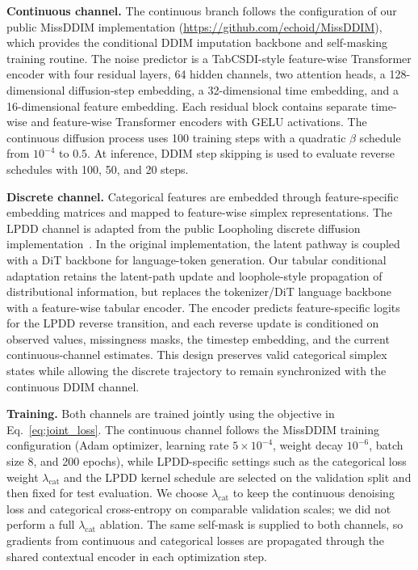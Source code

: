 \documentclass[times, review, 10pt]{elsarticle}
\newcommand{\DIFaddbegin}{\begingroup\color{blue}}
\newcommand{\DIFaddend}{\endgroup}
\begin{document}
\DIFaddend
\textbf{Continuous channel.}
\DIFaddbegin
The continuous branch follows the configuration of our public MissDDIM
implementation (\url{https://github.com/echoid/MissDDIM}), which provides the
conditional DDIM imputation backbone and self-masking training routine. The
noise predictor is a TabCSDI-style feature-wise Transformer encoder with four
residual layers, 64 hidden channels, two attention heads, a 128-dimensional
diffusion-step embedding, a 32-dimensional time embedding, and a
16-dimensional feature embedding. Each residual block contains separate
time-wise and feature-wise Transformer encoders with GELU activations. The
continuous diffusion process uses 100 training steps with a quadratic
$\beta$ schedule from $10^{-4}$ to $0.5$. At inference, DDIM step skipping is
used to evaluate reverse schedules with 100, 50, and 20 steps.
\DIFaddend

\textbf{Discrete channel.}
Categorical features are embedded through feature-specific embedding
\DIFaddbegin
matrices and mapped to feature-wise simplex representations. The LPDD channel
is adapted from the public Loopholing discrete diffusion implementation~\cite{loopholing}. In the original
implementation, the latent pathway is coupled with a DiT backbone for
language-token generation. Our tabular conditional adaptation retains the
latent-path update and loophole-style propagation of distributional
information, but replaces the tokenizer/DiT language backbone with a
feature-wise tabular encoder. The encoder predicts feature-specific logits for
the LPDD reverse transition, and each reverse update is conditioned on
observed values, missingness masks, the timestep embedding, and the current
continuous-channel estimates. This design preserves valid categorical
simplex states while allowing the discrete trajectory to remain synchronized
with the continuous DDIM channel.
\DIFaddend

\textbf{Training.}
\DIFaddbegin
Both channels are trained jointly using the objective in
Eq.~\eqref{eq:joint_loss}. The continuous channel follows the MissDDIM
training configuration (Adam optimizer, learning rate $5\times10^{-4}$,
weight decay $10^{-6}$, batch size 8, and 200 epochs), while LPDD-specific
settings such as the categorical loss weight $\lambda_{\mathrm{cat}}$ and the
LPDD kernel schedule are selected on the validation split and then fixed for
test evaluation. We choose $\lambda_{\mathrm{cat}}$ to keep the continuous
denoising loss and categorical cross-entropy on comparable validation scales;
we did not perform a full $\lambda_{\mathrm{cat}}$ ablation. The same self-mask
is supplied to both channels, so gradients from continuous and categorical
losses are propagated through the shared contextual encoder in each
optimization step.
\DIFaddend
\end{document}
